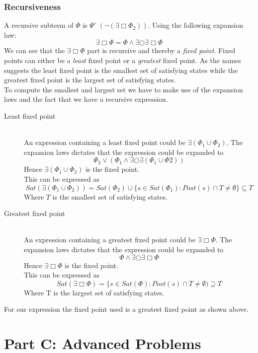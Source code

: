 \documentclass[12pt]{report}
\begin{document}
\subsection*{Recursiveness}
A recursive subterm of $\Phi$ is $\Psi'$ $\left(\neg(\exists \Box \Phi_2)\right)$. Using the following expansion law: $$\exists \Box \Phi = \Phi \wedge \exists \bigcirc \exists \Box \Phi$$
We can see that the $\exists \Box \Phi$ part is recursive and thereby a \emph{fixed point}. Fixed points can either be a \emph{least} fixed point or a \emph{greatest} fixed point. As the names suggests the least fixed point is the smallest set of satisfying states while the greatest fixed point is the largest set of satisfying states.\\
To compute the smallest and largest set we have to make use of the expansion laws and the fact that we have a recursive expression.
\begin{description}
	\item[Least fixed point]$\,$\\ %
	An expression containing a least fixed point could be $\exists (\Phi_1 \cup \Phi_2)$. The expansion laws dictates that the expression could be expanded to $$\Phi_2 \vee \left(\Phi_1 \wedge \exists \bigcirc \exists(\Phi_1 \cup \Phi2)\right)$$
	Hence $\exists (\Phi_1 \cup \Phi_2)$ is the fixed point.\\
	This can be expressed as
	$$Sat\left(\exists (\Phi_1 \cup \Phi_2)\right) = Sat(\Phi_2) \cup \{s \in Sat(\Phi_1) : Post(s) \cap T \neq \emptyset\} \subseteq T$$
	Where $T$ is the smallest set of satisfying states.
	
	\item[Greatest fixed point]$\,$\\
	An expression containing a greatest fixed point could be $\exists \Box \Phi$. The expansion laws dictates that the expression could be expanded to
	$$\Phi \wedge \exists \bigcirc \exists \Box \Phi$$
	Hence $\exists \Box \Phi$ is the fixed point.\\
	This can be expressed as
	$$Sat(\exists \Box \Phi) = \{s \in Sat(\Phi) : Post(s) \cap T \neq \emptyset) \supseteq T$$
	Where T is the largest set of satisfying states.
\end{description}
For our expression the fixed point used is a greatest fixed point as shown above.

\chapter*{Part C: Advanced Problems}
\end{document}
